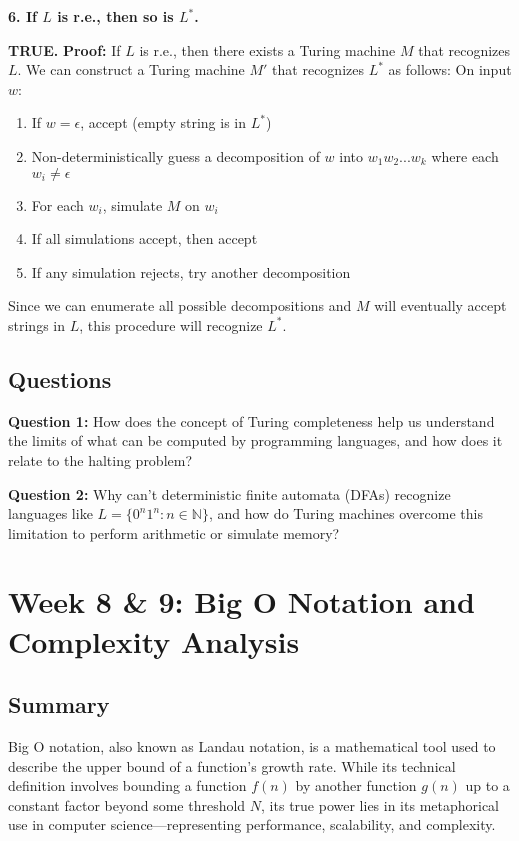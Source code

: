 \documentclass{article}
\begin{document}
\textbf{6. If $L$ is r.e., then so is $L^*$.}

\textbf{TRUE.}
\textbf{Proof:} If $L$ is r.e., then there exists a Turing machine $M$ that recognizes $L$. We can construct a Turing machine $M'$ that recognizes $L^*$ as follows:
On input $w$:
\begin{enumerate}
\item If $w = \epsilon$, accept (empty string is in $L^*$)
\item Non-deterministically guess a decomposition of $w$ into $w_1w_2...w_k$ where each $w_i \neq \epsilon$
\item For each $w_i$, simulate $M$ on $w_i$
\item If all simulations accept, then accept
\item If any simulation rejects, try another decomposition
\end{enumerate}
Since we can enumerate all possible decompositions and $M$ will eventually accept strings in $L$, this procedure will recognize $L^*$.

\subsection{Questions}

\textbf{Question 1:} How does the concept of Turing completeness help us understand the limits of what can be computed by programming languages, and how does it relate to the halting problem?

\textbf{Question 2:} Why can't deterministic finite automata (DFAs) recognize languages like $L = \{0^n1^n : n \in \mathbb{N}\}$, and how do Turing machines overcome this limitation to perform arithmetic or simulate memory?

\section{Week 8 \& 9: Big O Notation and Complexity Analysis}

\subsection{Summary}

Big O notation, also known as Landau notation, is a mathematical tool used to describe the upper bound of a function's growth rate. While its technical definition involves bounding a function $f(n)$ by another function $g(n)$ up to a constant factor beyond some threshold $N$, its true power lies in its metaphorical use in computer science—representing performance, scalability, and complexity.
\end{document}
